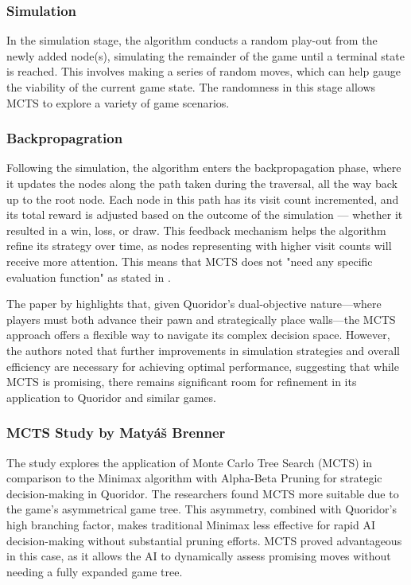 \documentclass[review]{cmpreport}
\begin{document}
\subsubsection{Simulation}
In the simulation stage, the algorithm conducts a random play-out from the newly added node(s), simulating the remainder of the game until a terminal state is reached. This involves making a series of random moves, which can help gauge the viability of the current game state. The randomness in this stage allows MCTS to explore a variety of game scenarios.

\subsubsection{Backpropagration}
Following the simulation, the algorithm enters the backpropagation phase, where it updates the nodes along the path taken during the traversal, all the way back up to the root node. Each node in this path has its visit count incremented, and its total reward is adjusted based on the outcome of the simulation — whether it resulted in a win, loss, or draw. This feedback mechanism helps the algorithm refine its strategy over time, as nodes representing with higher visit counts will receive more attention. This means that MCTS does not "need any specific evaluation function" as stated in \cite{brenner2015artificial}.

\noindent The paper by \cite{respall2018monte} highlights that, given Quoridor's dual-objective nature—where players must both advance their pawn and strategically place walls—the MCTS approach offers a flexible way to navigate its complex decision space. However, the authors noted that further improvements in simulation strategies and overall efficiency are necessary for achieving optimal performance, suggesting that while MCTS is promising, there remains significant room for refinement in its application to Quoridor and similar games.

\subsubsection{MCTS Study by Matyáš Brenner}
The study explores the application of Monte Carlo Tree Search (MCTS) in comparison to the Minimax algorithm with Alpha-Beta Pruning for strategic decision-making in Quoridor. The researchers found MCTS more suitable due to the game's asymmetrical game tree. This asymmetry, combined with Quoridor's high branching factor, makes traditional Minimax less effective for rapid AI decision-making without substantial pruning efforts. MCTS proved advantageous in this case, as it allows the AI to dynamically assess promising moves without needing a fully expanded game tree.
\end{document}
